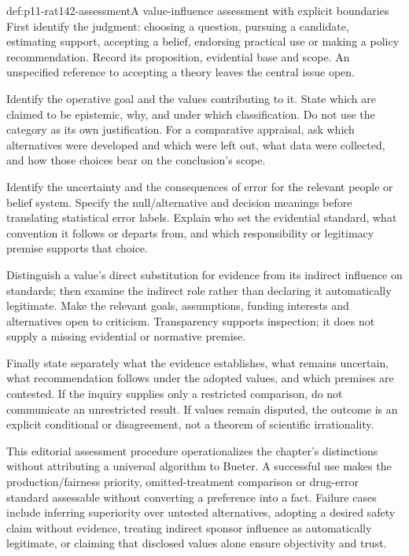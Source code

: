 \begin{hbmethod}{def:p11-rat142-assessment}{A value-influence assessment with explicit boundaries}
First identify the judgment: choosing a question, pursuing a candidate,
estimating support, accepting a belief, endorsing practical use or making
a policy recommendation. Record its proposition, evidential base and scope.
An unspecified reference to accepting a theory leaves the central issue open.

Identify the operative goal and the values contributing to it. State which
are claimed to be epistemic, why, and under which classification. Do not
use the category as its own justification. For a comparative appraisal,
ask which alternatives were developed and which were left out, what data
were collected, and how those choices bear on the conclusion's scope.

Identify the uncertainty and the consequences of error for the relevant
people or belief system. Specify the null/alternative and decision meanings
before translating statistical error labels. Explain who set the evidential
standard, what convention it follows or departs from, and which responsibility
or legitimacy premise supports that choice.

Distinguish a value's direct substitution for evidence from its indirect
influence on standards; then examine the indirect role rather than declaring
it automatically legitimate. Make the relevant goals, assumptions, funding
interests and alternatives open to criticism. Transparency supports
inspection; it does not supply a missing evidential or normative premise.

Finally state separately what the evidence establishes, what remains uncertain,
what recommendation follows under the adopted values, and which premises
are contested. If the inquiry supplies only a restricted comparison, do
not communicate an unrestricted result. If values remain disputed, the
outcome is an explicit conditional or disagreement, not a theorem of
scientific irrationality.
\end{hbmethod}

This editorial assessment procedure operationalizes the chapter's distinctions
without attributing a universal algorithm to Bueter. A successful use makes
the production/fairness priority, omitted-treatment comparison or drug-error
standard assessable without converting a preference into a fact. Failure
cases include inferring superiority over untested alternatives, adopting
a desired safety claim without evidence, treating indirect sponsor influence
as automatically legitimate, or claiming that disclosed values alone ensure
objectivity and trust.

